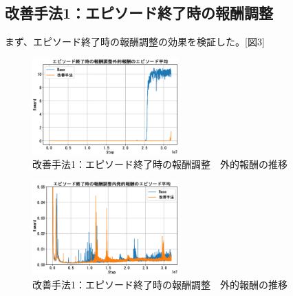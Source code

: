 \subsection{改善手法1：エピソード終了時の報酬調整}
まず、エピソード終了時の報酬調整の効果を検証した。[図3]
\begin{figure}[t]
   \centering
   \includegraphics[width=0.5\textwidth]{Method1_Ext.eps}
   \caption{改善手法1：エピソード終了時の報酬調整　外的報酬の推移}\label{fig:figure2}
\end{figure}
\begin{figure}[t]
   \centering
   \includegraphics[width=0.5\textwidth]{Method1_Intr.eps}
   \caption{改善手法1：エピソード終了時の報酬調整　外的報酬の推移}\label{fig:figure2}
\end{figure}

